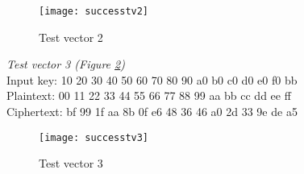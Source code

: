 \begin{figure}
  \texttt{[image: successtv2]}
  \caption{Test vector 2}
  \label{test:2}
\end{figure}

\emph{Test vector 3 (Figure \ref{test:3})} \\
Input key: 10 20 30 40 50 60 70 80 90 a0 b0 c0 d0 e0 f0 bb\\
Plaintext: 00 11 22 33 44 55 66 77 88 99 aa bb cc dd ee ff\\
Ciphertext: bf 99 1f aa 8b 0f e6 48 36 46 a0 2d 33 9e de a5

\begin{figure}
  \texttt{[image: successtv3]}
  \caption{Test vector 3}
  \label{test:3}
\end{figure}
